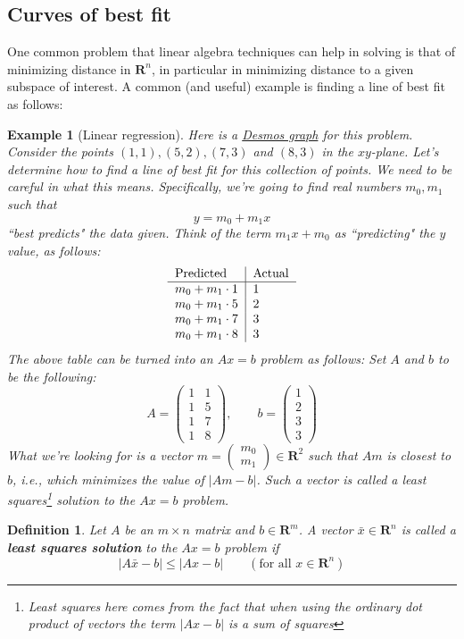 \documentclass[12pt]{article}
\numberwithin{equation}{subsection}
\numberwithin{figure}{subsection}
\newtheorem{defn}[subsection]{Definition}
\theoremstyle{note}
\newtheorem{example}[subsection]{Example}
\newcommand{\R}{\mathbf{R}}
\newcommand\m[1]{\begin{pmatrix}#1\end{pmatrix}}
\begin{document}
\subsection{Curves of best fit}
One common problem that linear algebra techniques can help in solving is that of minimizing distance in $\R^n$, in particular in minimizing distance to a given subspace of interest. A common (and useful) example is finding a line of best fit as follows:

\begin{example}[Linear regression] \label{ex-lin-reg}
Here is a \href{https://www.desmos.com/calculator/r9rxyjpbs4}{Desmos graph} for this problem. Consider the points $(1,1), (5,2), (7,3)$ and $(8,3)$ in the $xy$-plane. Let's determine how to find a line of best fit for this collection of points. We need to be careful in what this means. Specifically, we're going to find real numbers $m_0,m_1$ such that  \begin{equation} y=m_0+m_1x\end{equation} ``best predicts" the data given. Think of the term $m_1x+m_0$ as ``predicting" the $y$ value, as follows: \[\begin{tabular}{l | l}
 Predicted & Actual \\ \hline
$m_0+m_1\cdot 1$ & 1\\
$m_0+m_1\cdot 5 $ & 2\\
$m_0+m_1\cdot 7$ & 3\\
$m_0+m_1\cdot 8$ & 3\\
\end{tabular}\]
The above table can be turned into an $Ax=b$ problem as follows: Set $A$ and $b$ to be the following: \[A=\m{1 & 1\\1& 5 \\ 1& 7 \\ 1 & 8}, \qquad b=\m{1\\2\\3\\3}\] 
What we're looking for is a vector $m=\m{m_0\\m_1}\in \R^2$ such that $Am$ is closest to $b$, i.e., which minimizes the value of $|Am-b|$. Such a vector is called a \textit{least squares\footnote{Least squares here comes from the fact that when using the ordinary dot product of vectors the term $|Ax-b|$ is a sum of squares} solution} to the $Ax=b$ problem.

\end{example}

\begin{defn}
	Let $A$ be an $m\times n$ matrix and $b\in \R^m$. A vector $\bar{x}\in \R^n$ is called a \textbf{least squares solution} to the $Ax=b$ problem if \begin{equation} |A\bar{x}-b|\leq |Ax-b| \qquad (\text{for all $x\in \R^n$})
	\end{equation}
\end{defn}
\end{document}

